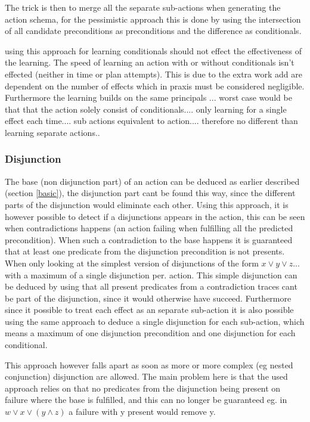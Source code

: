 	The trick is then to merge all the separate sub-actions when generating the action schema, for the pessimistic approach this is done by using the intersection of all candidate preconditions as preconditions and the difference as conditionals.
	
	
using this approach for learning conditionals should not effect the effectiveness of the learning.
	The speed of learning an action with or without conditionals isn't effected (neither in time or plan attempts). This is due to the extra work add are dependent on the number of effects which in praxis must be considered negligible. Furthermore the learning builds on the same principals ...  worst case would be that that the action solely consist of conditionals.... only learning for a single effect each time.... sub actions equivalent to action.... therefore no different than learning separate actions.. 
	

\subsubsection{Disjunction}
	The base (non disjunction part) of an action can be deduced as earlier described (section \ref{basic}), the disjunction part cant be found this way, since the different parts of the disjunction would eliminate each other. Using this approach, it is however possible to detect if a disjunctions appears in the action, this can be seen when contradictions happens (an action failing when fulfilling all the predicted precondition). When such a contradiction to the base happens it is guaranteed that at least one predicate from the disjunction precondition is not presents. When only looking at the simplest version of disjunctions of the form $ x \lor y \lor z...$ with a maximum of a single disjunction per. action. This simple disjunction can be deduced by using that all present predicates from a contradiction traces cant be part of the disjunction, since it would otherwise have succeed. Furthermore since it possible to treat each effect as an separate sub-action it is also possible using the same approach to deduce a single disjunction for each sub-action, which means a maximum of one disjunction precondition and one disjunction for each conditional. 
	
	This approach however falls apart as soon as more or more complex (eg nested conjunction) disjunction are allowed. The main problem here is that the used approach relies on that no predicates from the disjunction being present on failure where the base is fulfilled, and this can no longer be guaranteed eg. in $w \lor x \lor (y \land z )$ a failure with y present would remove y. 
	
